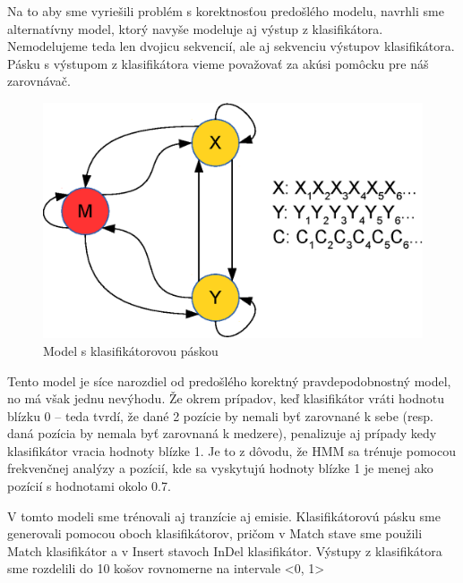 Na to aby sme vyriešili problém s korektnosťou predošlého modelu, navrhli sme alternatívny model, ktorý navyše modeluje aj výstup z klasifikátora.
Nemodelujeme teda len dvojicu sekvencií, ale aj sekvenciu výstupov klasifikátora.
Pásku s výstupom z klasifikátora vieme považovať za akúsi pomôcku pre náš zarovnávač.

\begin{figure}[htp]
    \centering
    \includegraphics[width=.5\textwidth]{images/model_clf_paska}
    \caption{Model s klasifikátorovou páskou}
\end{figure}


Tento model je síce narozdiel od predošlého korektný pravdepodobnostný model, no má však jednu nevýhodu. Že okrem prípadov, keď klasifikátor vráti hodnotu blízku 0 -- teda tvrdí, že dané 2 pozície by nemali byť zarovnané k sebe (resp. daná pozícia by nemala byť zarovnaná k medzere), penalizuje aj prípady kedy klasifikátor vracia hodnoty blízke 1. Je to z dôvodu, že HMM sa trénuje pomocou frekvenčnej analýzy a pozícií, kde sa vyskytujú hodnoty blízke 1 je menej ako pozícií s hodnotami okolo 0.7.

V tomto modeli sme trénovali aj tranzície aj emisie. Klasifikátorovú pásku sme generovali pomocou oboch klasifikátorov, pričom v Match stave sme použili Match klasifikátor a v Insert stavoch InDel klasifikátor.
Výstupy z klasifikátora sme rozdelili do 10 košov rovnomerne na intervale <0, 1>
